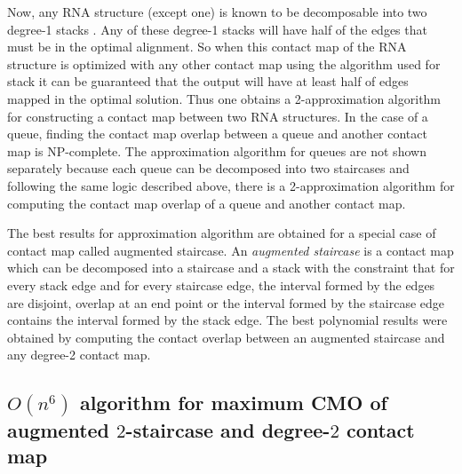 Now, any RNA structure (except one) is known to be decomposable into two degree-1 stacks \citep{goip99}. Any of these degree-1 stacks will have half of the edges that must be in the optimal alignment. So when this contact map of the RNA structure is optimized with any other contact map using the algorithm used for stack it can be guaranteed that the output will have at least half of edges mapped in the optimal solution. Thus one obtains a 2-approximation algorithm for constructing a contact map between two RNA structures. In the case of a queue, finding the contact map overlap between a queue and another contact map is NP-complete.  The approximation algorithm for queues are not shown separately because each queue can be decomposed into two staircases and following the same logic described above, there is a 2-approximation algorithm for computing the contact map overlap of a queue and another contact map.

The best results for approximation algorithm are obtained for a special case of contact map called augmented staircase. An \emph{augmented staircase} is a contact map which can be decomposed into a staircase and a stack with the constraint that for every stack edge and for every staircase edge, the interval formed by the edges are disjoint, overlap at an end point or the interval formed by the staircase edge contains the interval formed by the stack edge. The best polynomial results were obtained by computing the contact overlap between an augmented staircase and any degree-2 contact map.

\subsection{$O(n^6)$ algorithm for maximum CMO of augmented $2$-staircase and degree-$2$ contact map}

